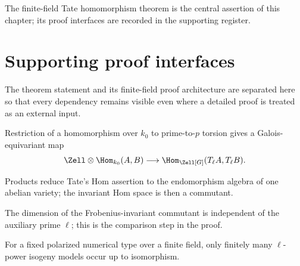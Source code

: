 \begin{remark}
\label{mumford-app1-tate-main-theorem}
The finite-field Tate homomorphism theorem is the central assertion of this
chapter; its proof interfaces are recorded in the supporting register.
\notready
\end{remark}

\section{Supporting proof interfaces}
\label{mumford-AppI-coverage-register}
The theorem statement and its finite-field proof architecture are separated
here so that every dependency remains visible even where a detailed proof is
treated as an external input.

\begin{definition}
\label{mumford-app1-tate-map-and-galois-invariants}
Restriction of a homomorphism over $k_0$ to prime-to-$p$ torsion gives a
Galois-equivariant map
\[
 \Zell\otimes\Hom_{k_0}(A,B)\longrightarrow
 \Hom_{\Zell[G]}(T_\ell A,T_\ell B).
\]
\notready
\end{definition}

\begin{remark}
\label{mumford-app1-step-reduction-endomorphisms}
Products reduce Tate's Hom assertion to the endomorphism algebra of one
abelian variety; the invariant Hom space is then a commutant.
\notready
\end{remark}

\begin{remark}
\label{mumford-app1-step-independence-l}
The dimension of the Frobenius-invariant commutant is independent of the
auxiliary prime $\ell$; this is the comparison step in the proof.
\notready
\end{remark}

\begin{convention}
\label{mumford-app1-hypothesis-finite-isogeny-models}
For a fixed polarized numerical type over a finite field, only finitely many
$\ell$-power isogeny models occur up to isomorphism.
\notready
\end{convention}

